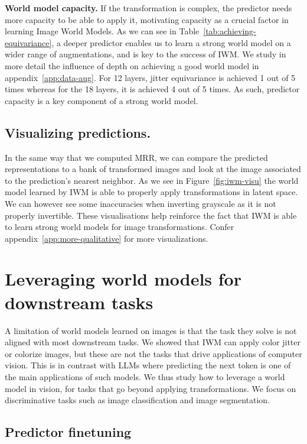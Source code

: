\documentclass[twocolumn]{fairmeta}
\theoremstyle{plain}
\theoremstyle{definition}
\theoremstyle{remark}
\begin{document}
\textbf{World model capacity.} If the transformation is complex, the predictor needs more capacity to be able to apply it, motivating capacity as a crucial factor in learning Image World Models.
As we can see in Table~\ref{tab:achieving-equivariance}, a deeper predictor enables us to learn a strong world model on a wider range of augmentations, and is key to the success of IWM. We study in more detail the influence of depth on achieving a good world model in appendix~\ref{app:data-aug}. For 12 layers, jitter equivariance is achieved 1 out of 5 times whereas for the 18 layers, it is achieved 4 out of 5 times. As such, predictor capacity is a key component of a strong world model.%




\subsection{Visualizing predictions.} In the same way that we computed MRR, we can compare the predicted representations to a bank of transformed images and look at the image associated to the prediction's nearest neighbor. As we see in Figure~\ref{fig:iwm-visu} the world model learned by IWM is able to properly apply transformations in latent space. We can however see some inaccuracies when inverting grayscale as it is not properly invertible.
These visualisations help reinforce the fact that IWM is able to learn strong world models for image transformations. Confer appendix~\ref{app:more-qualitative} for more visualizations.


\section{Leveraging world models for downstream tasks \label{sec:pred-ft}}

A limitation of world models learned on images is that the task they solve is not aligned with most downstream tasks. We showed that IWM can apply color jitter or colorize images, but these are not the tasks that drive applications of computer vision. This is in contrast with LLMs where predicting the next token is one of the main applications of such models. We thus study how to leverage a world model in vision, for tasks that go beyond applying transformations. We focus on discriminative tasks such as image classification and image segmentation.

\subsection{Predictor finetuning}
\end{document}
